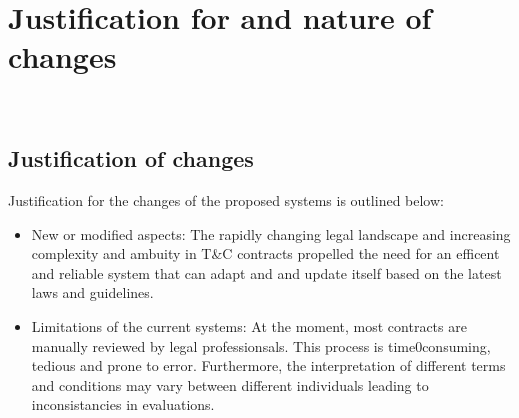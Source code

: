 \chapter{Justification for and nature of changes \\
\label{Chapter::Justification for and nature of changes}}\



\section{Justification of changes  \label{Section::Justification of changes} }
Justification for the changes of the proposed systems is outlined below: 
\begin{itemize}
    \item New or modified aspects: The rapidly changing legal landscape and increasing complexity and ambuity in T\&C contracts propelled the need for an efficent and reliable system that can adapt and and update itself based on the latest laws and guidelines. 
    \item Limitations of the current systems: At the moment, most contracts are manually reviewed by legal professionsals. This process is time0consuming, tedious and prone to error. Furthermore, the interpretation of different terms and conditions may vary between different individuals leading to inconsistancies in evaluations. 


\end{itemize}
